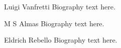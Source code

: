 \documentclass[journal]{IEEEtran}
\begin{document}
% 

\begin{IEEEbiography}{Luigi Vanfretti}
Biography text here.
\end{IEEEbiography}

\begin{IEEEbiography}{M S Almas}
Biography text here.
\end{IEEEbiography}

\begin{IEEEbiographynophoto}{Eldrich Rebello}
Biography text here.
\end{IEEEbiographynophoto}







\end{document}
